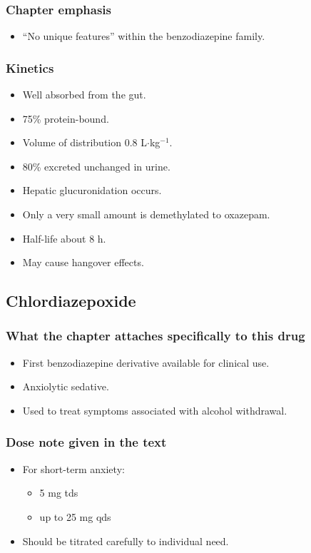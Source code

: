 \documentclass[11pt,a4paper]{article}
\begin{document}
\subsubsection{Chapter emphasis}
\begin{itemize}
  \item ``No unique features'' within the benzodiazepine family.
\end{itemize}

\subsubsection{Kinetics}
\begin{itemize}
  \item Well absorbed from the gut.
  \item 75\% protein-bound.
  \item Volume of distribution 0.8 L$\cdot$kg$^{-1}$.
  \item 80\% excreted unchanged in urine.
  \item Hepatic glucuronidation occurs.
  \item Only a very small amount is demethylated to oxazepam.
  \item Half-life about 8 h.
  \item May cause hangover effects.
\end{itemize}

\subsection{Chlordiazepoxide}

\subsubsection{What the chapter attaches specifically to this drug}
\begin{itemize}
  \item First benzodiazepine derivative available for clinical use.
  \item Anxiolytic sedative.
  \item Used to treat symptoms associated with alcohol withdrawal.
\end{itemize}

\subsubsection{Dose note given in the text}
\begin{itemize}
  \item For short-term anxiety:
  \begin{itemize}
    \item 5 mg tds
    \item up to 25 mg qds
  \end{itemize}
  \item Should be titrated carefully to individual need.
\end{itemize}
\end{document}

